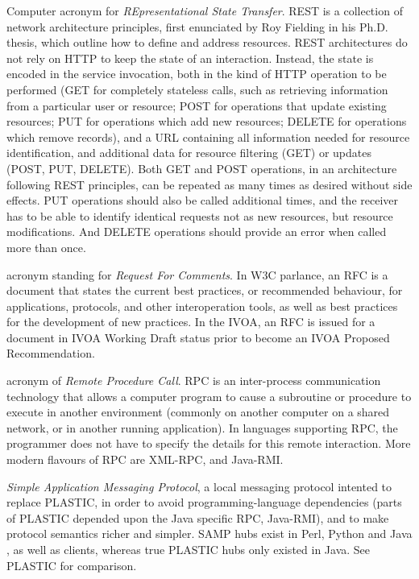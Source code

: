 {
    	Computer acronym for \emph{REpresentational State Transfer}.
        REST is a collection of network architecture principles, first
        enunciated by Roy Fielding in his Ph.D. thesis, which outline
        how to define and address resources. REST architectures do not
        rely on \gls{HTTP} to keep the state of an interaction.
        Instead, the state is encoded in the service invocation, both
        in the kind of HTTP operation to be performed (GET for
        completely stateless calls, such as retrieving information from
        a particular user or resource; POST for operations that update
        existing resources; PUT for operations which add new resources;
        DELETE for operations which remove records), and a URL
        containing all information needed for resource identification,
        and additional data for resource filtering (GET) or updates
        (POST, PUT, DELETE). Both GET and POST operations, in an
        architecture following REST principles, can be repeated as many
        times as desired without side effects. PUT operations should
        also be called additional times, and the receiver has to be
        able to identify identical requests not as new resources, but
        resource modifications. And DELETE operations should provide an
        error when called more than once.
}

{
    	acronym standing for \emph{Request For Comments}. In \gls{W3C}
        parlance, an RFC is a document that states the current best
        practices, or recommended behaviour, for applications,
        protocols, and other interoperation tools, as well as best
        practices for the development of new practices. In the
        \gls{IVOA}, an RFC is issued for a document in \gls{IVOA
        Working Draft} status prior to become an \gls{IVOA Proposed
        Recommendation}.
}

{
    	acronym of \emph{Remote Procedure Call}. RPC is an
        inter-process communication technology that allows a computer
        program to cause a subroutine or procedure to execute in
        another environment (commonly on another computer on a shared
        network, or in another running application). In languages
        supporting RPC, the programmer does not have to specify the
        details for this remote interaction. More modern flavours of
        RPC are \gls{XML-RPC}, and \gls{Java-RMI}.
}

{		\emph{Simple Application Messaging Protocol}, a local
		messaging protocol intented to replace \gls{PLASTIC}, in
		order to avoid programming-language dependencies (parts of
		PLASTIC depended upon the Java specific RPC, Java-RMI), and
		to make protocol semantics richer and simpler. SAMP hubs
		exist in \gls{Perl}, \gls{Python} and \gls{Java}
		, as well as clients,
		whereas true PLASTIC hubs only existed in Java. See
		\gls{PLASTIC} for comparison.
}

